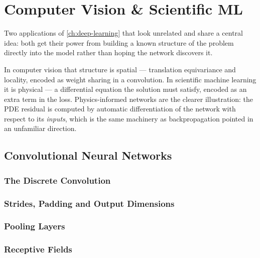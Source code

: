 %
\chapter{Computer Vision \& Scientific ML}
\label{ch:cv-sciml}

Two applications of \cref{ch:deep-learning} that look unrelated and share a
central idea: both get their power from building a known structure of the
problem directly into the model rather than hoping the network discovers it.

In computer vision that structure is spatial --- translation equivariance and
locality, encoded as weight sharing in a convolution. In scientific machine
learning it is physical --- a differential equation the solution must satisfy,
encoded as an extra term in the loss. Physics-informed networks are the clearer
illustration: the PDE residual is computed by automatic differentiation of the
network with respect to its \emph{inputs}, which is the same machinery as
backpropagation pointed in an unfamiliar direction.

\section{Convolutional Neural Networks}
\label{sec:cnn}

\subsection{The Discrete Convolution}

\subsection{Strides, Padding and Output Dimensions}

\subsection{Pooling Layers}

\subsection{Receptive Fields}

